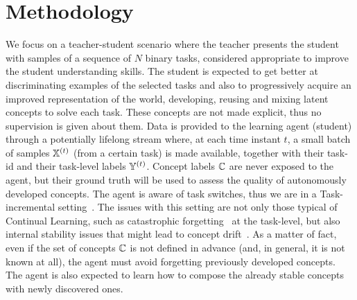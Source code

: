 \section{Methodology} %
\label{cem:sec:method}
We focus on a teacher-student scenario where the teacher presents the student with samples of a sequence of $N$ binary tasks, considered appropriate to improve the student understanding skills. %
The student is expected to get better at discriminating examples of the selected tasks and also to progressively acquire an improved representation of the world, developing, reusing and mixing latent concepts to solve each task. These concepts are not made explicit, thus no supervision is given about them.
Data is provided to the learning agent (student) through a potentially lifelong stream where, at each time instant $t$, a small batch of samples ${\mathbb{X}}^{(t)}$ (from a certain task) is made available, together with their task-id and their task-level labels ${\mathbb{Y}}^{(t)}$. Concept labels ${\mathbb{C}}$ are never exposed to the agent, but their ground truth will be used to assess the quality of autonomously developed concepts. %
The agent is aware of task switches, thus we are in a Task-incremental setting~\cite{van2022three}.
%
The issues with this setting are not only those typical of Continual Learning, such as catastrophic forgetting~\cite{parisi2019continual} at the task-level, but also internal stability issues that might lead to concept drift~\cite{marconato2023neuro}. As a matter of fact, even if the set of concepts ${\mathbb{C}}$ is not defined in advance (and, in general, it is not known at all), the agent must avoid forgetting previously developed concepts. %
The agent is also expected to learn how to compose the already stable concepts with newly discovered ones. %
%
